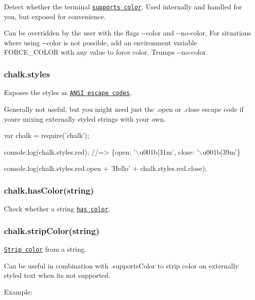 Detect whether the terminal \href{https://github.com/chalk/supports-color}{\tt supports color}. Used internally and handled for you, but exposed for convenience.

Can be overridden by the user with the flags {\ttfamily -\/-\/color} and {\ttfamily -\/-\/no-\/color}. For situations where using {\ttfamily -\/-\/color} is not possible, add an environment variable {\ttfamily F\+O\+R\+C\+E\+\_\+\+C\+O\+L\+O\+R} with any value to force color. Trumps {\ttfamily -\/-\/no-\/color}.

\subsubsection*{chalk.\+styles}

Exposes the styles as \href{https://github.com/chalk/ansi-styles}{\tt A\+N\+S\+I escape codes}.

Generally not useful, but you might need just the {\ttfamily .open} or {\ttfamily .close} escape code if you\textquotesingle{}re mixing externally styled strings with your own.


\begin{DoxyCode}
var chalk = require(\textcolor{stringliteral}{'chalk'});

console.log(chalk.styles.red);
\textcolor{comment}{//=> \{open: '\(\backslash\)u001b[31m', close: '\(\backslash\)u001b[39m'\}}

console.log(chalk.styles.red.open + \textcolor{stringliteral}{'Hello'} + chalk.styles.red.close);
\end{DoxyCode}


\subsubsection*{chalk.\+has\+Color(string)}

Check whether a string \href{https://github.com/chalk/has-ansi}{\tt has color}.

\subsubsection*{chalk.\+strip\+Color(string)}

\href{https://github.com/chalk/strip-ansi}{\tt Strip color} from a string.

Can be useful in combination with {\ttfamily .supports\+Color} to strip color on externally styled text when it\textquotesingle{}s not supported.

Example\+:


